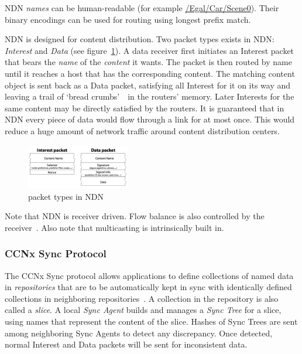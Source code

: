 \documentclass{sigchi}
\begin{document}
NDN \emph{names} can be human-readable (for example \url{/Egal/Car/Scene0}). Their binary encodings can be used for routing using longest prefix match.

NDN is designed for content distribution. Two packet types exists in NDN: \emph{Interest} and \emph{Data} (see figure~\ref{packet_types}). A data receiver first initiates an Interest packet that bears the \emph{name} of the \emph{content} it wants. The packet is then routed by name until it reaches a host that has the corresponding content. The matching content object is sent back as a Data packet, satisfying all Interest for it on its way and leaving a trail of `bread crumbs'~\cite{Jndn}~in the routers' memory. Later Interests for the same content may be directly satisfied by the routers. It is guaranteed that in NDN every piece of data would flow through a link for at most once. This would reduce a huge amount of network traffic around content distribution centers.

\begin{figure} 
\begin{center}
\includegraphics[width=0.4\textwidth] {image/packet_types}
\caption{packet types in NDN}
\label{packet_types}
\end{center}
\end{figure}

Note that NDN is receiver driven. Flow balance is also controlled by the receiver~\cite{Zact}. Also note that multicasting is intrinsically built in.

\subsubsection{CCNx Sync Protocol}
\label{ccnsync}

The CCNx Sync protocol allows applications to define collections of named data in \emph{repositories} that are to be automatically kept in sync with identically defined collections in neighboring repositories~\cite{CCNxSync}. A collection in the repository is also called a \emph{slice}. A local \emph{Sync Agent} builds and manages a \emph{Sync Tree} for a slice, using names that represent the content of the slice. Hashes of Sync Trees are sent among neighboring Sync Agents to detect any discrepancy. Once detected, normal Interest and Data packets will be sent for inconsistent data.
\end{document}
